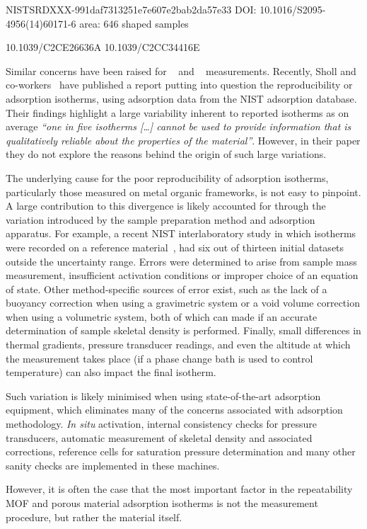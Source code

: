 NISTSRDXXX-991daf7313251e7e607e2bab2da57e33
DOI: 10.1016/S2095-4956(14)60171-6
area: 646
shaped samples

10.1039/C2CE26636A
10.1039/C2CC34416E

Similar concerns have been
raised for ~\cite{broomIrreproducibilityHydrogenStorage2016}
and ~\cite{espinalMeasurementStandardsData2013} measurements.
Recently, Sholl and co-workers~\cite{parkHowReproducibleAre2017}
have published a report putting into question the reproducibility
or adsorption isotherms, using  adsorption data from the 
NIST adsorption database. Their findings highlight a large
variability inherent
to reported isotherms as on average \textit{``one in five  
isotherms [\ldots] cannot be used to provide information that 
is qualitatively reliable about the properties of the material''}.
However, in their paper they do not explore the reasons behind the
origin of such large variations.

The underlying cause for the poor reproducibility of adsorption
isotherms, particularly those measured on metal organic frameworks,
is not easy to pinpoint. A large contribution to this divergence
is likely accounted for through the variation introduced by the
sample preparation method and adsorption apparatus.
For example, a recent NIST interlaboratory study in which  
isotherms were recorded on a reference 
material~\cite{nguyenReferenceHighpressureCO22018}, had six 
out of thirteen initial datasets outside the uncertainty range.
Errors were determined to arise from sample mass measurement,
insufficient activation conditions or improper choice of an 
equation of state. Other method-specific sources of error exist,
such as the lack of a buoyancy correction when using a 
gravimetric system or a void volume correction when using 
a volumetric system, both of which can made if an accurate
determination of sample skeletal density is performed. Finally,
small differences in thermal gradients, pressure transducer
readings, and even the altitude at which the measurement takes place
(if a phase change bath is used to control temperature)
can also impact the final isotherm.

Such variation is likely minimised when using state-of-the-art 
adsorption equipment, which eliminates many of the concerns
associated with adsorption methodology. \textit{In situ}
activation, internal consistency checks for pressure transducers,
automatic measurement of skeletal density and associated 
corrections, reference cells for saturation pressure determination
and many other sanity checks are implemented in these machines.

However, it is often the case that the most important factor
in the repeatability MOF and porous material adsorption isotherms 
is not the measurement procedure, but rather the material itself.
